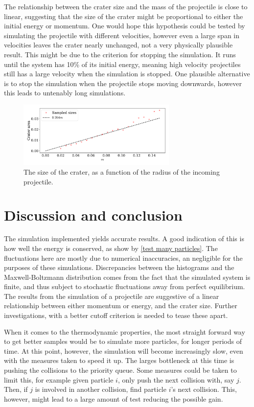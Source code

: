 \documentclass{article}
\begin{document}
    The relationship between the crater size and the mass of the projectile is close to linear, suggesting that the size of the crater might be proportional to either the initial energy or momentum.
    One would hope this hypothesis could be tested by simulating the projectile with different velocities, however even a large span in velocities leaves the crater nearly unchanged, not a very physically plausible result. 
    This might be due to the criterion for stopping the simulation.
    It runs until the system has 10\% of its initial energy, meaning high velocity projectiles still has a large velocity when the simulation is stopped. 
    One plausible alternative is to stop the simulation when the projectile stops moving downwards, however this leads to untenably long simulations.

    \begin{figure}[H]
        \centering
        \includegraphics[width=0.7\textwidth]{../plots/problem4/crater_size.pdf}
        \caption{The size of the crater, as a function of the radius of the incoming projectile.}
        \label{crater size}
    \end{figure}

    \section*{Discussion and conclusion}
    The simulation implemented yields accurate results.
    A good indication of this is how well the energy is conserved, as show by \autoref{test many particles}.
    The fluctuations here are mostly due to numerical inaccuracies, an negligible for the purposes of these simulations.
    Discrepancies between the histograms and the Maxwell-Boltzmann distribution comes from the fact that the simulated system is finite, and thus subject to stochastic fluctuations away from perfect equilibrium.
    The results from the simulation of a projectile are suggestive of a linear relationship between either momentum or energy, and the crater size.
    Further investigations, with a better cutoff criterion is needed to tease these apart.

    When it comes to the thermodynamic properties, the most straight forward way to get better samples would be to simulate more particles, for longer periods of time.
    At this point, however, the simulation will become increasingly slow, even with the measures taken to speed it up.
    The larges bottleneck at this time is pushing the collisions to the priority queue.
    Some measures could be taken to limit this, for example given particle $i$, only push the next collision with, say $j$.
    Then, if $j$ is involved in another collision, find particle $i$'s next collision.
    This, however, might lead to a large amount of test reducing the possible gain.
    
    \printbibliography
\end{document}

